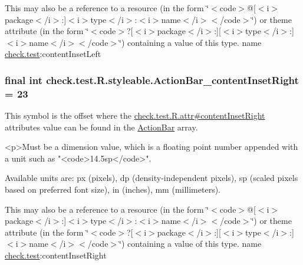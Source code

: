 This may also be a reference to a resource (in the form \char`\"{}$<$code$>$@\mbox{[}$<$i$>$package$<$/i$>$\+:\mbox{]}$<$i$>$type$<$/i$>$\+:$<$i$>$name$<$/i$>$$<$/code$>$\char`\"{}) or theme attribute (in the form \char`\"{}$<$code$>$?\mbox{[}$<$i$>$package$<$/i$>$\+:\mbox{]}\mbox{[}$<$i$>$type$<$/i$>$\+:\mbox{]}$<$i$>$name$<$/i$>$$<$/code$>$\char`\"{}) containing a value of this type.  name \hyperlink{namespacecheck_1_1test}{check.\+test}\+:content\+Inset\+Left \hypertarget{classcheck_1_1test_1_1_r_1_1styleable_a2e6574bce599da88fada999852ecddff}{}
\subsubsection[{Action\+Bar\+\_\+content\+Inset\+Right}]{\setlength{\rightskip}{0pt plus 5cm}final int check.\+test.\+R.\+styleable.\+Action\+Bar\+\_\+content\+Inset\+Right = 23\hspace{0.3cm}{\ttfamily [static]}}\label{classcheck_1_1test_1_1_r_1_1styleable_a2e6574bce599da88fada999852ecddff}
This symbol is the offset where the \hyperlink{classcheck_1_1test_1_1_r_1_1attr_a72fa272b4d22878eaf90ba1b801a2aa2}{check.\+test.\+R.\+attr\#content\+Inset\+Right} attribute\textquotesingle{}s value can be found in the \hyperlink{classcheck_1_1test_1_1_r_1_1styleable_ad0a4d403cb244ea4d22c6f6ebf2c2cdf}{Action\+Bar} array.

\begin{DoxyVerb}      <p>Must be a dimension value, which is a floating point number appended with a unit such as "<code>14.5sp</code>".
\end{DoxyVerb}
 Available units are\+: px (pixels), dp (density-\/independent pixels), sp (scaled pixels based on preferred font size), in (inches), mm (millimeters). 

This may also be a reference to a resource (in the form \char`\"{}$<$code$>$@\mbox{[}$<$i$>$package$<$/i$>$\+:\mbox{]}$<$i$>$type$<$/i$>$\+:$<$i$>$name$<$/i$>$$<$/code$>$\char`\"{}) or theme attribute (in the form \char`\"{}$<$code$>$?\mbox{[}$<$i$>$package$<$/i$>$\+:\mbox{]}\mbox{[}$<$i$>$type$<$/i$>$\+:\mbox{]}$<$i$>$name$<$/i$>$$<$/code$>$\char`\"{}) containing a value of this type.  name \hyperlink{namespacecheck_1_1test}{check.\+test}\+:content\+Inset\+Right \hypertarget{classcheck_1_1test_1_1_r_1_1styleable_a4c5e7ea9ebcd8ec777039551daa8f3f5}{}
